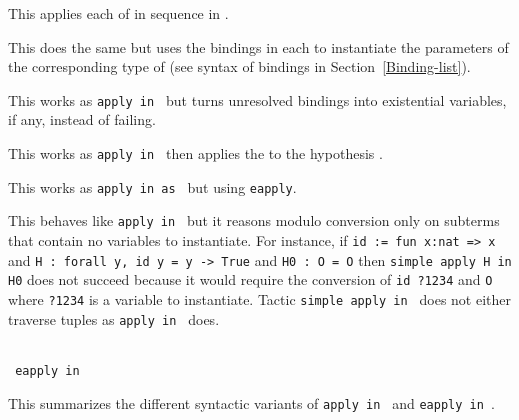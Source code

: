 \begin{Variants}
\item {}

This applies each of {\term} in sequence in {\ident}.

\item {}

This does the same but uses the bindings in each {\bindinglist} to
instantiate the parameters of the corresponding type of {\term}
(see syntax of bindings in Section~\ref{Binding-list}).

\item {}

This works as {\tt apply  in
{\ident}} but turns unresolved bindings into existential variables, if
any, instead of failing.

\item {}

This works as {\tt apply  in
{\ident}} then applies the {\intropattern} to the hypothesis {\ident}.

\item {}

This works as {\tt apply  in {\ident} as {\intropattern}} but using {\tt eapply}.

\item {}

This behaves like {\tt apply {\term} in {\ident}} but it reasons
modulo conversion only on subterms that contain no variables to
instantiate. For instance, if {\tt id := fun x:nat => x} and {\tt H :
  forall y, id y = y -> True} and {\tt H0 :\ O = O} then {\tt simple
  apply H in H0} does not succeed because it would require the
conversion of {\tt id ?1234} and {\tt O} where {\tt ?1234} is a variable to
instantiate.  Tactic {\tt simple apply {\term} in {\ident}} does not
either traverse tuples as {\tt apply {\term} in {\ident}} does.

\item {}\\
{\tt {} eapply  in {\ident} }

This summarizes the different syntactic variants of {\tt apply {\term}
  in {\ident}} and {\tt eapply {\term} in {\ident}}.
\end{Variants}

